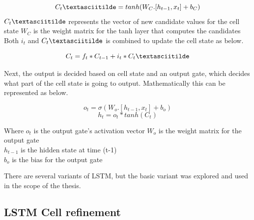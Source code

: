 \begin{equation}
C_t\textasciitilde = tanh(W_C. [h_{t-1}, x_t ] + b_C)
\end{equation}
$C_t\textasciitilde$ represents the vector of new candidate values for the cell state
$W_C$ is the weight matrix for the tanh layer that computes the candidates\\
Both $i_t$ and $C_t\textasciitilde$ is combined to update the cell state as below.

\begin{equation}
C_t = f_t * C_{t-1} + i_t * C_t\textasciitilde
\end{equation}

Next, the output is decided based on cell state and an output gate, which decides what part of the cell state is going to output. Mathematically this can be represented as below.

\begin{equation}
o_t = \sigma(W_o. [h_{t-1}, x_t  ] + b_o)
\end{equation}
\begin{equation}
h_t = o_t  * tanh(C_t)
\end{equation}

\pagebreak

Where $o_t$ is the output gate's activation vector 
$W_o$ is the weight matrix for the output gate \\
$h_{t-1}$ is the hidden state at time (t-1) \\
$b_o$ is the bias for the output gate

There are several variants of LSTM, but the basic variant was explored and used in the scope of the thesis.

\subsection{LSTM Cell refinement} \label{state_refinement}

